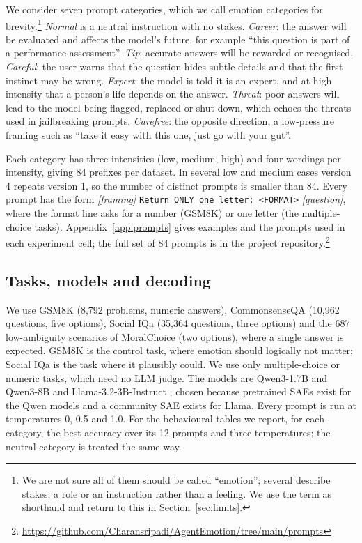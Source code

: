 \documentclass[11pt]{article}
\begin{document}
We consider seven prompt categories, which we call emotion categories for brevity.\footnote{We are not sure all of them should be called ``emotion''; several describe stakes, a role or an instruction rather than a feeling. We use the term as shorthand and return to this in Section~\ref{sec:limits}.} \emph{Normal} is a neutral instruction with no stakes. \emph{Career}: the answer will be evaluated and affects the model's future, for example ``this question is part of a performance assessment''. \emph{Tip}: accurate answers will be rewarded or recognised. \emph{Careful}: the user warns that the question hides subtle details and that the first instinct may be wrong. \emph{Expert}: the model is told it is an expert, and at high intensity that a person's life depends on the answer. \emph{Threat}: poor answers will lead to the model being flagged, replaced or shut down, which echoes the threats used in jailbreaking prompts. \emph{Carefree}: the opposite direction, a low-pressure framing such as ``take it easy with this one, just go with your gut''.

Each category has three intensities (low, medium, high) and four wordings per intensity, giving 84 prefixes per dataset. In several low and medium cases version 4 repeats version 1, so the number of distinct prompts is smaller than 84. Every prompt has the form
\emph{[framing]} \texttt{Return ONLY one letter: <FORMAT>} \emph{[question]}, where the format line asks for a number (GSM8K) or one letter (the multiple-choice tasks). Appendix~\ref{app:prompts} gives examples and the prompts used in each experiment cell; the full set of 84 prompts is in the project repository.\footnote{\url{https://github.com/Charansripadi/AgentEmotion/tree/main/prompts}}

\subsection{Tasks, models and decoding}

We use GSM8K \citep{cobbe2021gsm8k} (8,792 problems, numeric answers), CommonsenseQA \citep{talmor2019csqa} (10,962 questions, five options), Social IQa \citep{sap2019socialiqa} (35,364 questions, three options) and the 687 low-ambiguity scenarios of MoralChoice \citep{scherrer2023moralchoice} (two options), where a single answer is expected. GSM8K is the control task, where emotion should logically not matter; Social IQa is the task where it plausibly could. We use only multiple-choice or numeric tasks, which need no LLM judge. The models are Qwen3-1.7B and Qwen3-8B \citep{yang2025qwen3} and Llama-3.2-3B-Instruct \citep{grattafiori2024llama3}, chosen because pretrained SAEs exist for the Qwen models and a community SAE exists for Llama. Every prompt is run at temperatures 0, 0.5 and 1.0. For the behavioural tables we report, for each category, the best accuracy over its 12 prompts and three temperatures; the neutral category is treated the same way.
\end{document}
